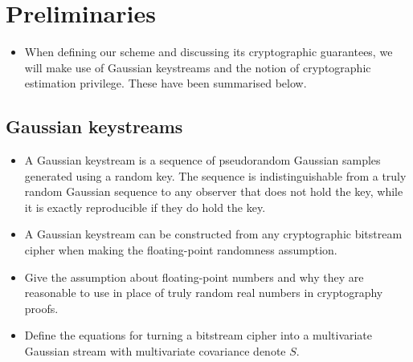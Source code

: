 \documentclass[conference]{IEEEtran}
\begin{document}
% 
%                                                                 
%                                                                 
%                                                                 
% 

\section{Preliminaries}\label{sec:prelim}
\begin{itemize}
  \item When defining our scheme and discussing its cryptographic guarantees, we will make use of Gaussian keystreams and the notion of cryptographic estimation privilege. These have been summarised below.
\end{itemize}
\subsection{Gaussian keystreams}\label{subsec:gauss_keystreams}
\begin{itemize}
  \item A Gaussian keystream is a sequence of pseudorandom Gaussian samples generated using a random key. The sequence is indistinguishable from a truly random Gaussian sequence to any observer that does not hold the key, while it is exactly reproducible if they do hold the key.
  \item A Gaussian keystream can be constructed from any cryptographic bitstream cipher when making the floating-point randomness assumption.
  \item Give the assumption about floating-point numbers and why they are reasonable to use in place of truly random real numbers in cryptography proofs.
  \item Define the equations for turning a bitstream cipher into a multivariate Gaussian stream with multivariate covariance denote $S$.
\end{itemize}
\end{document}
